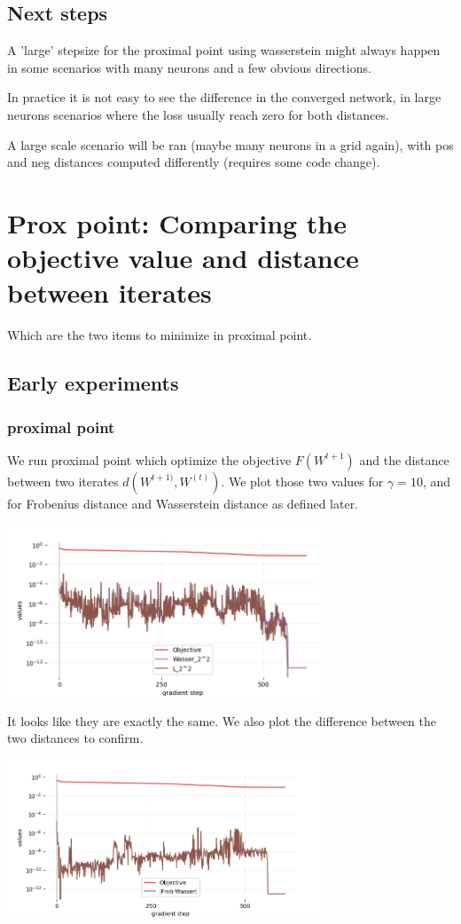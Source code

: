 \subsection{Next steps}

A 'large' stepsize for the proximal point using wasserstein might always happen in some scenarios with many neurons and a few obvious directions.

In practice it is not easy to see the difference in the converged network, in large neurons scenarios where the loss usually reach zero for both distances.

A large scale scenario will be ran (maybe many neurons in a grid again), with pos and neg distances computed differently (requires some code change).

\section{Prox point: Comparing the objective value and distance between iterates}
Which are the two items to minimize in proximal point.
\subsection{Early experiments}
\subsubsection{proximal point}

We run proximal point which optimize the objective $F(W^{t+1})$ and the distance between two iterates $d(W^{t+1)}, W^{(t)})$. We plot those two values for $\gamma=10$, and for Frobenius distance and Wasserstein distance as defined later.

\includegraphics[width=0.7\textwidth]{imgs/tau10_graph_full.png}

It looks like they are exactly the same. We also plot the difference between the two distances to confirm.

\includegraphics[width=0.7\textwidth]{imgs/tau10_graph.png}

